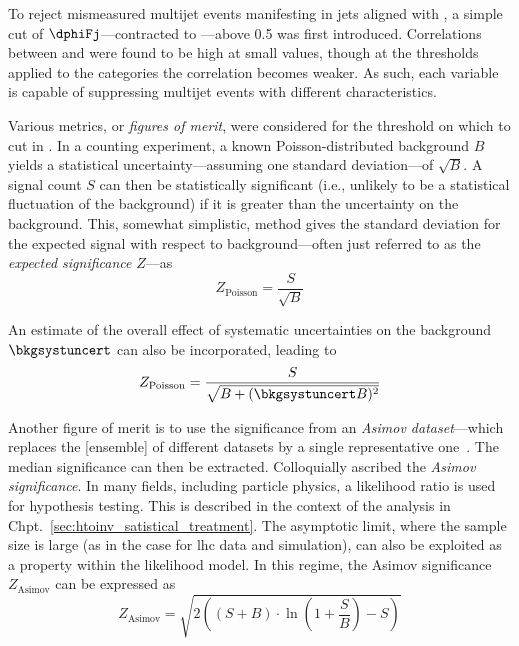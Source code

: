 To reject mismeasured multijet events manifesting in \glspl{jet} aligned with \ptmiss, a simple cut of $\dphiFj$---contracted to \mindphi---above 0.5 was first introduced. Correlations between \mindphi and \omegaTilde were found to be high at small values, though at the thresholds applied to the categories the correlation becomes weaker. As such, each variable is capable of suppressing multijet events with different characteristics.

Various metrics, or \emph{figures of merit}, were considered for the threshold on which to cut in \omegaTilde. In a counting experiment, a known Poisson-distributed background $B$ yields a statistical uncertainty---assuming one standard deviation---of $\sqrt{B}$. A signal count $S$ can then be statistically significant (i.e., unlikely to be a statistical fluctuation of the background) if it is greater than the uncertainty on the background. This, somewhat simplistic, method gives the standard deviation for the expected signal with respect to background---often just referred to as the \emph{expected significance} $Z$---as
\begin{equation}
Z_{\mathrm{Poisson}} = \frac{S}{\sqrt{B}}
\label{eq:s_over_root_b}
\end{equation}

An estimate of the overall effect of systematic uncertainties on the background $\bkgsystuncert$ can also be incorporated, leading to
\begin{equation}
Z_{\mathrm{Poisson}} = \frac{S}{\sqrt{B + (\bkgsystuncert B)^2}}
\label{eq:s_over_root_b_systs}
\end{equation}

Another figure of merit is to use the significance from an \emph{Asimov dataset}---which replaces the [ensemble] of different datasets by a single representative one~\cite{Cowan:2010js}. The median significance can then be extracted. Colloquially ascribed the \emph{Asimov significance}. In many fields, including particle physics, a likelihood ratio is used for hypothesis testing. This is described in the context of the analysis in Chpt.~\ref{sec:htoinv_satistical_treatment}. The asymptotic limit, where the sample size is large (as in the case for \acrshort{lhc} data and simulation), can also be exploited as a property within the likelihood model. In this regime, the Asimov significance $Z_{\mathrm{Asimov}}$ can be expressed as  %
\begin{equation}
Z_{\mathrm{Asimov}} = \sqrt{2 \left( (S + B) \cdot \ln\left(1 + \frac{S}{B} \right) - S \right)}
\label{eq:asimov_significance}
\end{equation}

